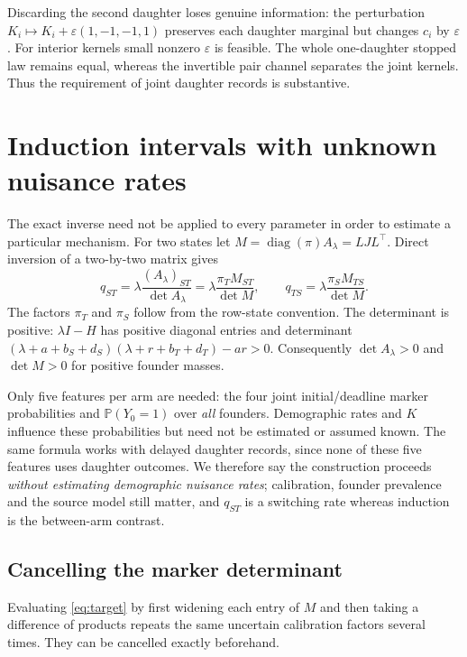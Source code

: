 \documentclass[11pt]{article}
\theoremstyle{definition}
\newcommand{\diag}{\operatorname{diag}}
\newcommand{\Prob}{\mathbb P}
\begin{document}
Discarding the second daughter loses genuine information: the perturbation
$K_i\mapsto K_i+\varepsilon(1,-1,-1,1)$ preserves each daughter marginal but
changes $c_i$ by $\varepsilon$. For interior kernels small nonzero $\varepsilon$
is feasible. The whole one-daughter stopped law remains equal, whereas the
invertible pair channel separates the joint kernels. Thus the requirement of
joint daughter records is substantive.

\section{Induction intervals with unknown nuisance rates}\label{sec:inference}
The exact inverse need not be applied to every parameter in order to estimate a
particular mechanism. For two states let $M=\diag(\pi)A_\lambda=LJL^\top$.
Direct inversion of a two-by-two matrix gives
\begin{equation}\label{eq:target}
 q_{ST}=\lambda\frac{(A_\lambda)_{ST}}{\det A_\lambda}
       =\lambda\frac{\pi_T M_{ST}}{\det M},\qquad
 q_{TS}=\lambda\frac{\pi_S M_{TS}}{\det M}.
\end{equation}
The factors $\pi_T$ and $\pi_S$ follow from the row-state convention. The
determinant is positive: $\lambda I-H$ has positive diagonal entries and
determinant $(\lambda+a+b_S+d_S)(\lambda+r+b_T+d_T)-ar>0$. Consequently
$\det A_\lambda>0$ and $\det M>0$ for positive founder masses.

Only five features per arm are needed: the four joint initial/deadline marker
probabilities and $\Prob(Y_0=1)$ over \emph{all} founders. Demographic rates and
$K$ influence these probabilities but need not be estimated or assumed known.
The same formula works with delayed daughter records, since none of these five
features uses daughter outcomes. We therefore say the construction proceeds
\emph{without estimating demographic nuisance rates}; calibration, founder
prevalence and the source model still matter, and $q_{ST}$ is a switching rate
whereas induction is the between-arm contrast.

\subsection{Cancelling the marker determinant}\label{sec:cancel}
Evaluating \eqref{eq:target} by first widening each entry of $M$ and then taking
a difference of products repeats the same uncertain calibration factors several
times. They can be cancelled exactly beforehand.
\end{document}
